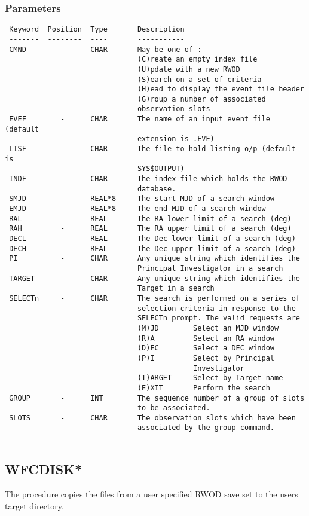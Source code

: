 \documentclass{book}
\renewcommand{\_}{{\tt\char'137}}     %
\begin{document}
\subsubsection{Parameters}
\begin{verbatim}
 Keyword  Position  Type       Description
 -------  --------  ----       -----------
 CMND        -      CHAR       May be one of :
                               (C)reate an empty index file
                               (U)pdate with a new RWOD
                               (S)earch on a set of criteria
                               (H)ead to display the event file header
                               (G)roup a number of associated
                               observation slots
 EVEF        -      CHAR       The name of an input event file (default
                               extension is .EVE)
 LISF        -      CHAR       The file to hold listing o/p (default is
                               SYS$OUTPUT)
 INDF        -      CHAR       The index file which holds the RWOD
                               database.
 SMJD        -      REAL*8     The start MJD of a search window
 EMJD        -      REAL*8     The end MJD of a search window
 RAL         -      REAL       The RA lower limit of a search (deg)
 RAH         -      REAL       The RA upper limit of a search (deg)
 DECL        -      REAL       The Dec lower limit of a search (deg)
 DECH        -      REAL       The Dec upper limit of a search (deg)
 PI          -      CHAR       Any unique string which identifies the
                               Principal Investigator in a search
 TARGET      -      CHAR       Any unique string which identifies the
                               Target in a search
 SELECTn     -      CHAR       The search is performed on a series of
                               selection criteria in response to the
                               SELECTn prompt. The valid requests are
                               (M)JD        Select an MJD window
                               (R)A         Select an RA window
                               (D)EC        Select a DEC window
                               (P)I         Select by Principal
                                            Investigator
                               (T)ARGET     Select by Target name
                               (E)XIT       Perform the search
 GROUP       -      INT        The sequence number of a group of slots
                               to be associated.
 SLOTS       -      CHAR       The observation slots which have been
                               associated by the group command.
 
\end{verbatim}\subsection{WFCDISK*}
The procedure copies the files from a user specified RWOD save set
to the users target directory.
 
\end{document}
